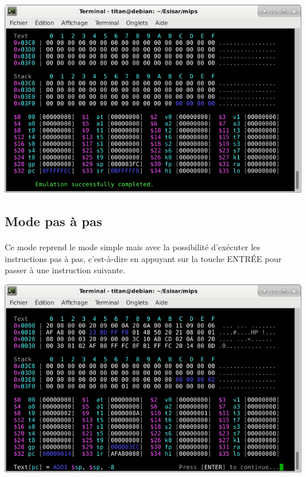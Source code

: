 \documentclass[12pt]{report} %
\begin{document}
\begin{center}
    \includegraphics[width=\textwidth]{MIPS-mpEmulator-ModeSimple.png}
\end{center}


    \subsection{Mode pas à pas}

    \paragraph{}
    Ce mode reprend le mode simple mais avec la possibilité d'exécuter les instructions pas à pas, c'est-à-dire en appuyant sur la touche {\ttfamily ENTRÉE} pour passer à une instruction suivante.

\begin{center}
    \includegraphics[width=\textwidth]{MIPS-mpEmulator-ModePasPas.png}
\end{center}
\end{document}
